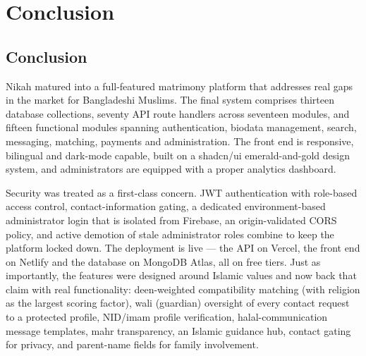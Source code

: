 \documentclass[12pt,a4paper]{report}
\begin{document}
\chapter{Conclusion}

\section{Conclusion}
Nikah matured into a full-featured matrimony platform that addresses real gaps
in the market for Bangladeshi Muslims. The final system comprises thirteen
database collections, seventy API route handlers across seventeen modules, and
fifteen functional modules spanning authentication, biodata management, search,
messaging, matching, payments and administration. The front end is responsive,
bilingual and dark-mode capable, built on a shadcn/ui emerald-and-gold design
system, and administrators are equipped with a proper analytics dashboard.

Security was treated as a first-class concern. JWT authentication with
role-based access control, contact-information gating, a dedicated
environment-based administrator login that is isolated from Firebase, an
origin-validated CORS policy, and active demotion of stale administrator roles
combine to keep the platform locked down. The deployment is live --- the API on
Vercel, the front end on Netlify and the database on MongoDB Atlas, all on free
tiers. Just as importantly, the features were designed around Islamic values
and now back that claim with real functionality: deen-weighted compatibility
matching (with religion as the largest scoring factor), wali (guardian)
oversight of every contact request to a protected profile, NID/imam profile
verification, halal-communication message templates, mahr transparency, an
Islamic guidance hub, contact gating for privacy, and parent-name fields for
family involvement.
\end{document}

